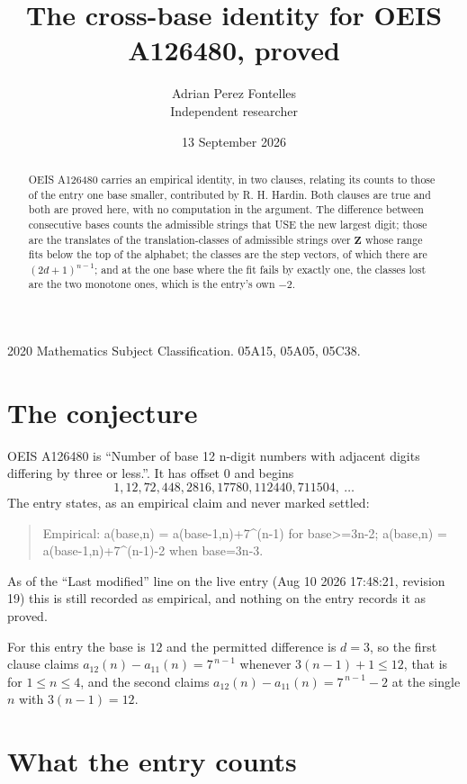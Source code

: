 \documentclass[11pt,a4paper]{article}
\title{The cross-base identity for OEIS A126480, proved}
\author{Adrian Perez Fontelles\\ \small Independent researcher}
\date{13 September 2026}
\theoremstyle{plain}
\theoremstyle{definition}
\begin{document}
\maketitle

\begin{abstract}
OEIS A126480 carries an empirical identity, in two clauses, relating its counts to those of the
entry one base smaller, contributed by R. H. Hardin. Both clauses are true and both are proved
here, with no computation in the argument. The difference between consecutive bases counts the
admissible strings that USE the new largest digit; those are the translates of the
translation-classes of admissible strings over $\mathbf{Z}$ whose range fits below the top of
the alphabet; the classes are the step vectors, of which there are $(2d+1)^{n-1}$; and at the
one base where the fit fails by exactly one, the classes lost are the two monotone ones, which
is the entry's own $-2$.
\end{abstract}

\noindent\small 2020 Mathematics Subject Classification. 05A15, 05A05, 05C38.\normalsize

\section{The conjecture}

OEIS A126480 is ``Number of base 12 n-digit numbers with adjacent digits differing by three or less.''. It has offset $0$ and begins
\[
1, 12, 72, 448, 2816, 17780, 112440, 711504,\ \dots
\]
The entry states, as an empirical claim and never marked settled:
\begin{quote}
Empirical: a(base,n) = a(base-1,n)+7\textasciicircum{}(n-1) for base>=3n-2; a(base,n) = a(base-1,n)+7\textasciicircum{}(n-1)-2 when base=3n-3.
\end{quote}
As of the ``Last modified'' line on the live entry (Aug 10 2026 17:48:21, revision 19)
this is still recorded as empirical, and nothing on the entry records it as proved.

For this entry the base is $12$ and the permitted difference is $d=3$, so the first clause
claims $a_{12}(n)-a_{11}(n)=7^{\,n-1}$ whenever $3(n-1)+1\le12$, that is for
$1\le n\le4$, and the second claims $a_{12}(n)-a_{11}(n)=7^{\,n-1}-2$ at the single
$n$ with $3(n-1)=12$.

\section{What the entry counts}
\end{document}
